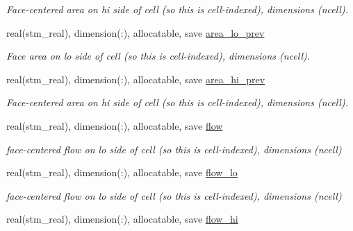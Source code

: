 \begin{CompactItemize}
\begin{CompactList}\small\item\em Face-centered area on hi side of cell (so this is cell-indexed), dimensions (ncell). \item\end{CompactList}\item 
\hypertarget{a00070_c665871f040416717ae2c5f477b95bee}{
real(stm\_\-real), dimension(:), allocatable, save \hyperlink{a00070_c665871f040416717ae2c5f477b95bee}{area\_\-lo\_\-prev}}
\label{a00070_c665871f040416717ae2c5f477b95bee}

\begin{CompactList}\small\item\em Face area on lo side of cell (so this is cell-indexed), dimensions (ncell). \item\end{CompactList}\item 
\hypertarget{a00070_f5e6452e9812a0634752d37cedd5ebee}{
real(stm\_\-real), dimension(:), allocatable, save \hyperlink{a00070_f5e6452e9812a0634752d37cedd5ebee}{area\_\-hi\_\-prev}}
\label{a00070_f5e6452e9812a0634752d37cedd5ebee}

\begin{CompactList}\small\item\em Face-centered area on hi side of cell (so this is cell-indexed), dimensions (ncell). \item\end{CompactList}\item 
\hypertarget{a00070_cc6ce757faeeb434edff90ff9492306b}{
real(stm\_\-real), dimension(:), allocatable, save \hyperlink{a00070_cc6ce757faeeb434edff90ff9492306b}{flow}}
\label{a00070_cc6ce757faeeb434edff90ff9492306b}

\begin{CompactList}\small\item\em face-centered flow on lo side of cell (so this is cell-indexed), dimensions (ncell) \item\end{CompactList}\item 
\hypertarget{a00070_e9ea22e405c983d268cc5a809fb72560}{
real(stm\_\-real), dimension(:), allocatable, save \hyperlink{a00070_e9ea22e405c983d268cc5a809fb72560}{flow\_\-lo}}
\label{a00070_e9ea22e405c983d268cc5a809fb72560}

\begin{CompactList}\small\item\em face-centered flow on lo side of cell (so this is cell-indexed), dimensions (ncell) \item\end{CompactList}\item 
\hypertarget{a00070_95c5de80de6aa30207228956f5e11c56}{
real(stm\_\-real), dimension(:), allocatable, save \hyperlink{a00070_95c5de80de6aa30207228956f5e11c56}{flow\_\-hi}}
\label{a00070_95c5de80de6aa30207228956f5e11c56}


\end{CompactItemize}
